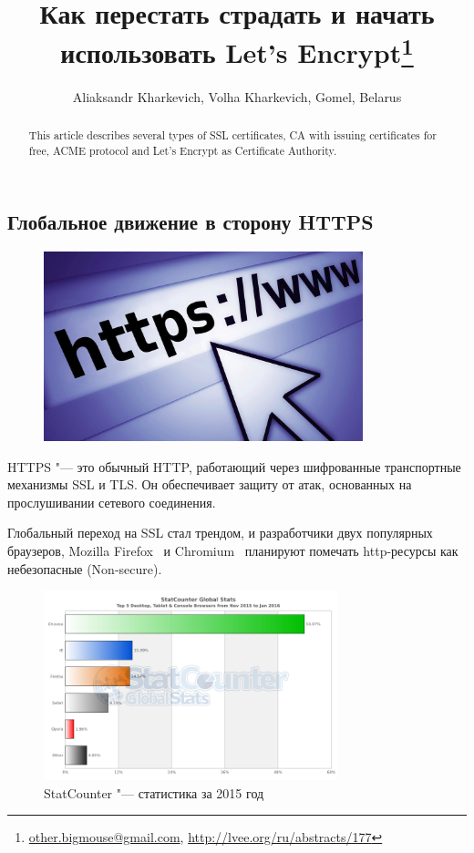 \documentclass[10pt, a5paper]{article}
\begin{document}
\title{Как перестать страдать и начать использовать Let's Encrypt\footnote{\url{other.bigmouse@gmail.com}, \url{http://lvee.org/ru/abstracts/177}}}
\author{Aliaksandr Kharkevich, Volha Kharkevich, Gomel, Belarus}
\maketitle

\begin{abstract}
This article describes several types of SSL certificates, CA with issuing certificates for free, ACME protocol and Let's Encrypt as Certificate Authority.
\end{abstract}

\subsection*{Глобальное движение в сторону HTTPS}

\begin{figure}[h!]
  \centering
  \includegraphics[height=5.5cm]{w_03_2016_Kharkevich1.png}
  
\end{figure}

HTTPS "--- это обычный HTTP, работающий через шифрованные транспортные механизмы SSL и TLS. Он обеспечивает защиту от атак, основанных на прослушивании сетевого соединения.

Глобальный переход на SSL стал трендом, и разработчики двух популярных браузеров, Mozilla Firefox~\cite{Kharkevich1} и Chromium~\cite{Kharkevich2} планируют помечать http-ресурсы как небезопасные (Non-secure).

\begin{figure}[h!]
  \centering
  \includegraphics[height=5.5cm]{w_03_2016_Kharkevich2.png}
\caption*{StatCounter "--- статистика за 2015 год}
\end{figure}
\end{document}
